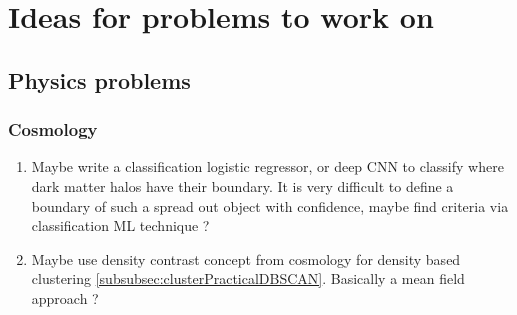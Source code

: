 

\chapter{Ideas for problems to work on}
\section{Physics problems}
\subsection{Cosmology}
\begin{enumerate}
	\item Maybe write a classification logistic regressor, or deep CNN to classify where dark matter halos have their boundary. It is very difficult to define a boundary of such a spread out object with confidence, maybe find criteria via classification ML technique ?
\item Maybe use density contrast concept from cosmology for density based clustering \ref{subsubsec:clusterPracticalDBSCAN}. Basically a mean field approach ?
\end{enumerate}

